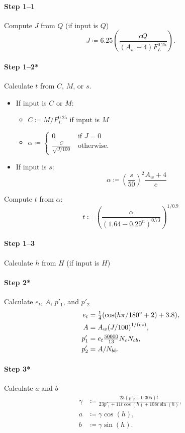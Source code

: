 \documentclass[twocolumn]{scrartcl}
\begin{document}
\paragraph{Step 1--1}{%
  Compute $J$ from $Q$ (if input is $Q$)
  \[
    J\coloneqq 6.25 \left(\frac{cQ}{(A_w+4) F_L^{0.25}}\right).
    \]}

\paragraph{Step 1--2*}{%
Calculate $t$ from $C$, $M$, or $s$.

\begin{itemize}

  \item If input is $C$ or $M$:
    \begin{itemize}
      \item $C\coloneqq M / F_L^{0.25}$ if input is $M$
      \item $\alpha\coloneqq\begin{cases}
          0 &\:\text{if $J=0$}\\
          \frac{C}{\sqrt{J/100}}&\:\text{otherwise}.
      \end{cases}$
    \end{itemize}
  \item If input is $s$:
    \[
    \alpha \coloneqq {\left(\frac{s}{50}\right)}^2 \frac{A_w+4}{c}
    \]
\end{itemize}
Compute $t$ from $\alpha$:
\[
  t \coloneqq {\left(\frac{\alpha}{{(1.64 - 0.29^n)}^{0.73}}\right)}^{1/0.9}
\]
}

\paragraph{Step 1--3}{%
  Calculate $h$ from $H$ (if input is $H$)
}

\paragraph{Step 2*}{%
Calculate $e_t$, $A$, $p'_1$, and $p'_2$
\begin{align*}
  e_t &= \tfrac{1}{4} (\cos(h\pi/180\degree + 2) + 3.8),\\
  A &= A_w  {(J/100)}^{1/(cz)},\\
  p'_1 &= e_t \tfrac{50000}{13} N_c N_{cb},\\
  p'_2 &= A / N_{bb}.
\end{align*}}
\paragraph{Step 3*}{%
Calculate $a$ and $b$
  \begin{align*}
    \gamma &\coloneqq \frac{23 (p'_2+0.305) t}{23 p'_1 + 11 t \cos(h) + 108 t \sin(h)},\\
    a &\coloneqq \gamma \cos(h),\\
    b &\coloneqq \gamma \sin(h).
  \end{align*}}
\end{document}
